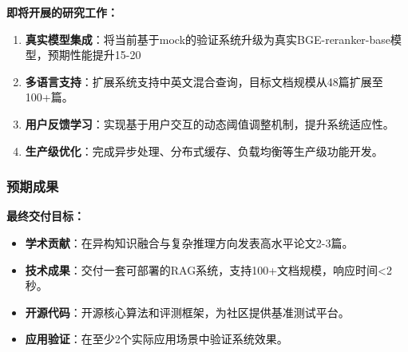 \textbf{即将开展的研究工作：}

\begin{enumerate}
    \item \textbf{真实模型集成}：将当前基于mock的验证系统升级为真实BGE-reranker-base模型，预期性能提升15-20%
    
    \item \textbf{多语言支持}：扩展系统支持中英文混合查询，目标文档规模从48篇扩展至100+篇。
    
    \item \textbf{用户反馈学习}：实现基于用户交互的动态阈值调整机制，提升系统适应性。
    
    \item \textbf{生产级优化}：完成异步处理、分布式缓存、负载均衡等生产级功能开发。
\end{enumerate}

\subsubsection{预期成果}

\textbf{最终交付目标：}

\begin{itemize}
    \item \textbf{学术贡献}：在异构知识融合与复杂推理方向发表高水平论文2-3篇。
    
    \item \textbf{技术成果}：交付一套可部署的RAG系统，支持100+文档规模，响应时间<2秒。
    
    \item \textbf{开源代码}：开源核心算法和评测框架，为社区提供基准测试平台。
    
    \item \textbf{应用验证}：在至少2个实际应用场景中验证系统效果。
\end{itemize}
